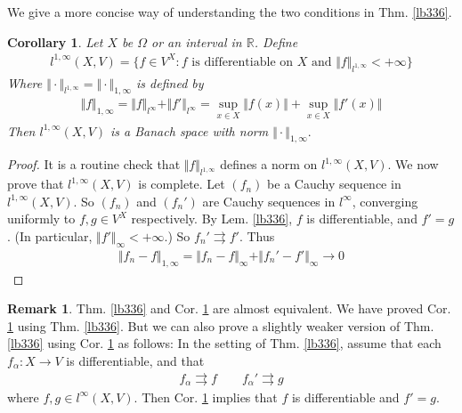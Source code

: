 \documentclass[12pt,b5paper,notitlepage]{article}
\theoremstyle{definition}
\newtheorem{rem}[df]{Remark}
\theoremstyle{plain}
\newtheorem{co}[df]{Corollary}
\newcommand{\Rbb}{\mathbb R}
\numberwithin{equation}{section}
\begin{document}
We give a more concise way of understanding the two conditions in Thm. \ref{lb336}.


\begin{co}\label{lb344}
Let $X$ be $\Omega$ or an interval in $\Rbb$. Define 
\begin{align*}
l^{1,\infty}(X,V)=\{f\in V^X: f\text{ is differentiable on }X\text{ and }\Vert f\Vert_{l^{1,\infty}}<+\infty\}
\end{align*}
Where $\Vert \cdot\Vert_{l^{1,\infty}}=\Vert\cdot\Vert_{1,\infty}$ is defined by 
\begin{align*}
\Vert f\Vert_{1,\infty}=\Vert f\Vert_{l^\infty}+\Vert f'\Vert_{l^\infty}=\sup_{x\in X}\Vert f(x)\Vert+\sup_{x\in X}\Vert f'(x)\Vert
\end{align*}
Then $l^{1,\infty}(X,V)$ is a Banach space with norm $\Vert\cdot\Vert_{1,\infty}.$
\end{co}


\begin{proof}
It is a routine check that $\Vert f\Vert_{l^{1,\infty}}$ defines a norm on ${l^{1,\infty}}(X,V)$. We now prove that ${l^{1,\infty}}(X,V)$ is complete. Let $(f_n)$ be a Cauchy sequence in ${l^{1,\infty}}(X,V)$. So $(f_n)$ and $(f_n')$ are Cauchy sequences in $l^\infty$, converging uniformly to $f,g\in V^X$ respectively. By Lem. \ref{lb336}, $f$ is differentiable, and $f'=g$. (In particular, $\Vert f'\Vert_\infty<+\infty$.) So $f_n'\rightrightarrows f'$. Thus
\begin{align*}
\Vert f_n-f\Vert_{1,\infty}=\Vert f_n-f\Vert_\infty+\Vert f_n'-f'\Vert_\infty\rightarrow 0
\end{align*} 
\end{proof}


\begin{rem}
Thm. \ref{lb336} and Cor. \ref{lb344} are almost equivalent. We have proved Cor. \ref{lb344} using Thm. \ref{lb336}. But we can also prove a slightly weaker version of Thm. \ref{lb336} using Cor. \ref{lb344} as follows: In the setting of Thm. \ref{lb336}, assume that each $f_\alpha:X\rightarrow V$ is differentiable, and that 
\begin{align}\label{eq128}
f_\alpha\rightrightarrows f\qquad f_\alpha'\rightrightarrows g
\end{align}
where $f,g\in l^\infty(X,V)$. Then  Cor. \ref{lb344} implies that $f$ is differentiable and $f'=g$. 
\end{rem}
\end{document}
